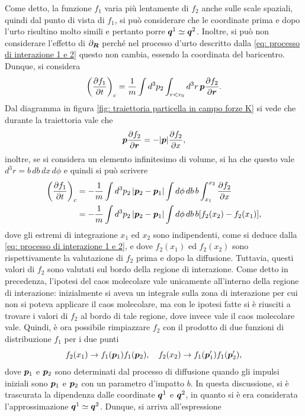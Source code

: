 Come detto, la funzione $f_1$ varia più lentamente di $f_2$ anche sulle scale spaziali, quindi dal punto di vista di $f_1$, si può considerare che le coordinate prima e dopo l'urto risultino molto simili e pertanto porre $\bm{q}^1\simeq\bm{q}^2$. Inoltre, si può non considerare l'effetto di $\partial_{\bm{R}}$ perché nel processo d'urto descritto dalla \eqref{eq: processo di interazione 1 e 2} questo non cambia, essendo la coordinata del baricentro. Dunque, si considera
\begin{equation}
     \bigg(\frac{\partial f_1}{\partial t}\bigg)_c = \frac{1}{m}\int d^3p_2\int_{r<r_0}d^3r\,\bm{p}\frac{\partial f_2}{\partial \bm{r}}.
\end{equation}
Dal diagramma in figura \ref{fig: traiettoria particella in campo forze K} si vede che durante la traiettoria vale che
\begin{equation}
    \bm{p}\frac{\partial f_2}{\partial \bm{r}} = -|\bm{p}|\frac{\partial f_2}{\partial x},
\end{equation}
inoltre, se si considera un elemento infinitesimo di volume, si ha che questo vale $d^3r = b\,db\,dx\,d\phi$ e quindi si può scrivere
\begin{equation}
    \begin{split}
        \bigg(\frac{\partial f_1}{\partial t}\bigg)_c &= -\frac{1}{m}\int d^3p_2\,|\bm{p}_2 - \bm{p}_1|\int d\phi\,db\,b\int_{x_1}^{x_2}\frac{\partial f_2}{\partial x} \\
        &= -\frac{1}{m}\int d^3p_2\,|\bm{p}_2 - \bm{p}_1|\int d\phi\,db\,b[f_2(x_2) - f_2(x_1)],
    \end{split}
\end{equation}
dove gli estremi di integrazione $x_1$ ed $x_2$ sono indipendenti, come si deduce dalla \eqref{eq: processo di interazione 1 e 2}, e dove $f_2(x_1)$ ed $f_2(x_2)$ sono rispettivamente la valutazione di $f_2$ prima e dopo la diffusione. Tuttavia, questi valori di $f_2$ sono valutati sul bordo della regione di interazione. Come detto in precedenza, l'ipotesi del caos molecolare vale unicamente all'interno della regione di interazione: inizialmente si aveva un integrale sulla zona di interazione per cui non si poteva applicare il caos molecolare, ma con le ipotesi fatte si è riusciti a trovare i valori di $f_2$ al bordo di tale regione, dove invece vale il caos molecolare vale. Quindi, è ora possibile rimpiazzare $f_2$ con il prodotto di due funzioni di distribuzione $f_1$ per i due punti
\begin{equation}
    f_2(x_1) \to f_1(\bm{p}_1)f_1(\bm{p}_2),\quad f_2(x_2) \to f_1(\bm{p}_1')f_1(\bm{p}_2'),
\end{equation}
dove $\bm{p}_1$ e $\bm{p}_2$ sono determinati dal processo di diffusione quando gli impulsi iniziali sono $\bm{p}_1$ e $\bm{p}_2$ con un parametro d'impatto $b$. In questa discussione, si è trascurata la dipendenza dalle coordinate $\bm{q}^1$ e $\bm{q}^2$, in quanto si è era considerata l'approssimazione $\bm{q}^1 \simeq \bm{q}^2$. Dunque, si arriva all'espressione

